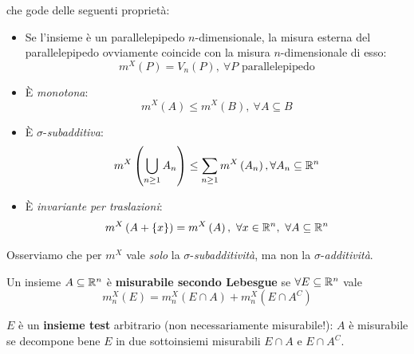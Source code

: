 	che gode delle seguenti proprietà:
	\begin{itemize}
		\item Se l'insieme è un parallelepipedo $n$-dimensionale, la misura esterna del parallelepipedo ovviamente coincide con la misura $n$-dimensionale di esso:
		\begin{equation}
			m^X\left(P\right)=V_n\left(P\right),\ \forall P\text{ parallelepipedo}
		\end{equation}
		\item È \textit{monotona}:
		\begin{equation}
			m^X\left(A\right)\leq m^X\left(B\right),\ \forall A\subseteq B
		\end{equation}
		\item È $\sigma$-\textit{subadditiva}:
		\begin{equation}
			m^X\left(\bigcup_{n\geq 1}A_n\right)\leq \sum_{n\geq 1}m^X\left(A_n\right), \forall A_n\subseteq \mathbb{R}^n
		\end{equation}
		\item È \textit{invariante per traslazioni}:
		\begin{equation}
			m^X\left(A+\left\{x\right\}\right)=m^X\left(A\right),\ \forall x\in\realset^n,\ \forall A\subseteq\realset^n
		\end{equation}
	\end{itemize}
	Osserviamo che per $m^X$ vale \textit{solo} la  $\sigma$-\textit{subadditività}, ma non la $\sigma$-\textit{additività}.
	\begin{define}
		Un insieme $A\subseteq\mathbb{R}^n$ è \textbf{misurabile secondo Lebesgue} se $\forall E\subseteq\mathbb{R}^n$ vale
		\begin{equation}
			m_n^X\left(E\right)=m_n^X\left(E\cap A\right)+m_n^X\left(E\cap A^C\right)
		\end{equation}
	\end{define}
	$E$ è un \textbf{insieme test} arbitrario (non necessariamente misurabile!): $A$ è misurabile se decompone bene $E$ in due sottoinsiemi misurabili $E\cap A$ e $E\cap A^C$.
